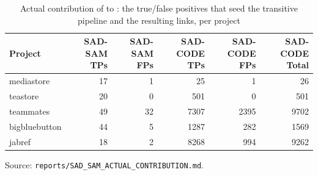 \begin{table}[htbp]
  \centering
  \caption{Actual contribution of \sadsam to \transarc: the \sadsam true/false positives that seed the transitive pipeline and the resulting \sadcode links, per project}
  \label{tab:sadsam-contribution}
  \begin{tabular}{lrrrrr}
    \toprule
    Project & SAD-SAM TPs & SAD-SAM FPs & SAD-CODE TPs & SAD-CODE FPs & SAD-CODE Total \\
    \midrule
    mediastore & 17 & 1 & 25 & 1 & 26 \\
    teastore & 20 & 0 & 501 & 0 & 501 \\
    teammates & 49 & 32 & 7307 & 2395 & 9702 \\
    bigbluebutton & 44 & 5 & 1287 & 282 & 1569 \\
    jabref & 18 & 2 & 8268 & 994 & 9262 \\
    \bottomrule
  \end{tabular}
  \par\smallskip\footnotesize Source: \texttt{reports/SAD\_SAM\_ACTUAL\_CONTRIBUTION.md}.
\end{table}
